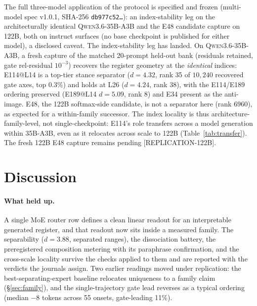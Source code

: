 \documentclass[10pt,a4paper,twocolumn]{article}
\begin{document}
The full three-model application of the protocol is specified and frozen
(multi-model spec v1.0.1, SHA-256 \texttt{db977c52\ldots}): an index-stability
leg on the architecturally identical \textsc{Qwen3.6-35B-A3B} and the E48
candidate capture on 122B, both on instruct surfaces (no base checkpoint is
published for either model), a disclosed caveat. The index-stability leg has
landed. On \textsc{Qwen3.6-35B-A3B}, a fresh capture of the matched 20-prompt
held-out bank (residuals retained, gate rel-residual $10^{-3}$) recovers the
register geometry at the \emph{identical} indices: E114@L14 is a top-tier stance
separator ($d{=}4.32$, rank 35 of $10{,}240$ recovered gate axes, top $0.3\%$)
and holds at L26 ($d{=}4.24$, rank 38), with the E114/E189 ordering preserved
(E189@L14 $d{=}5.09$, rank 8) and E34 present as the anti-image. E48, the 122B
softmax-side candidate, is not a separator here (rank $6960$), as expected for a
within-family successor. The index locality is thus architecture-family-level,
not single-checkpoint: E114's role transfers across a model generation within
35B-A3B, even as it relocates across scale to 122B
(Table~\ref{tab:transfer}). The fresh 122B E48 capture remains pending
[REPLICATION-122B].

\section{Discussion}\label{sec:disc}

\paragraph{What held up.}
A single MoE router row defines a clean linear readout for an interpretable
generated register, and that readout now sits inside a measured family. The
separability ($d{=}3.88$, separated ranges), the dissociation battery, the
preregistered composition metering with its paraphrase confirmation, and the
cross-scale locality survive the checks applied to them and are reported with
the verdicts the journals assign. Two earlier readings moved under
replication: the best-separating-expert baseline relocates uniqueness to a
family claim (\S\ref{sec:family}), and the single-trajectory gate lead
reverses as a typical ordering (median $-8$ tokens across 55 onsets,
gate-leading 11\%).
\end{document}

